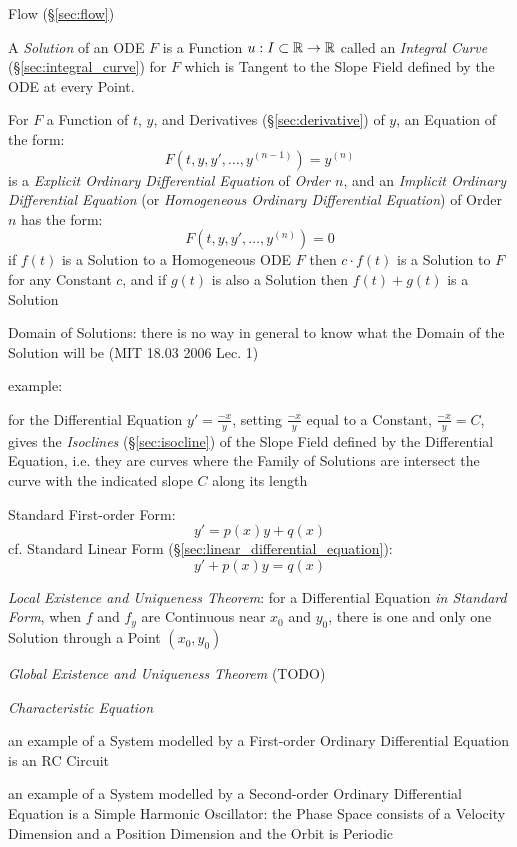 \fist Flow (\S\ref{sec:flow})

A \emph{Solution} of an ODE $F$ is a Function $u : I \subset \mathbb{R} \rightarrow
\mathbb{R}$ called an \emph{Integral Curve} (\S\ref{sec:integral_curve}) for $F$
which is Tangent to the Slope Field defined by the ODE at every Point.

For $F$ a Function of $t$, $y$, and Derivatives (\S\ref{sec:derivative}) of
$y$, an Equation of the form:
\[
  F(t,y,y',\ldots,y^{(n-1)}) = y^{(n)}
\]
is a \emph{Explicit Ordinary Differential Equation} of \emph{Order $n$}, and an
\emph{Implicit Ordinary Differential Equation} (or \emph{Homogeneous Ordinary
  Differential Equation}) of Order $n$ has the form:
\[
  F(t,y,y',\ldots,y^{(n)}) = 0
\]
if $f(t)$ is a Solution to a Homogeneous ODE $F$ then $c\cdot{f(t)}$ is a
Solution to $F$ for any Constant $c$, and if $g(t)$ is also a Solution then
$f(t) + g(t)$ is a Solution


Domain of Solutions: there is no way in general to know what the Domain of the
Solution will be (MIT 18.03 2006 Lec. 1)

example:

for the Differential Equation $y' = \frac{-x}{y}$, setting $\frac{-x}{y}$ equal
to a Constant, $\frac{-x}{y} = C$, gives the \emph{Isoclines}
(\S\ref{sec:isocline}) of the Slope Field defined by the Differential Equation,
i.e. they are curves where the Family of Solutions are intersect the
curve with the indicated slope $C$ along its length

Standard First-order Form:
\[
  y' = p(x) y + q(x)
\]
cf. Standard Linear Form (\S\ref{sec:linear_differential_equation}):
\[
  y' + p(x) y = q(x)
\]

\emph{Local Existence and Uniqueness Theorem}: for a Differential Equation
\emph{in Standard Form}, when $f$ and $f_y$ are Continuous near $x_0$ and
$y_0$, there is one and only one Solution through a Point $(x_0, y_0)$

\emph{Global Existence and Uniqueness Theorem} (TODO)


\emph{Characteristic Equation}

an example of a System modelled by a First-order Ordinary Differential Equation
is an RC Circuit

an example of a System modelled by a Second-order Ordinary Differential
Equation is a Simple Harmonic Oscillator: the Phase Space consists of a
Velocity Dimension and a Position Dimension and the Orbit is Periodic



